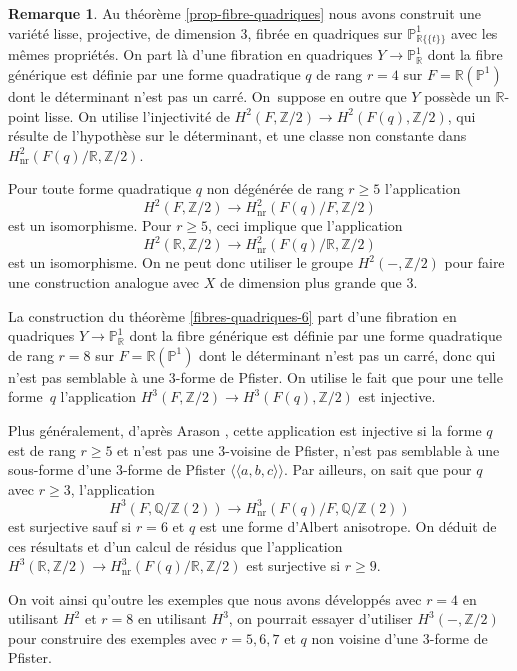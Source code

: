 \documentclass[JEP,XML,SOM,Unicode,francais,published]{cedram}
\theoremstyle{definition}
\newtheorem{rmk}[thm]{Remarque}
\newcommand{\Q}{\mathbb Q}
\newcommand{\Z}{\mathbb Z}
\newcommand{\R}{\mathbb R}
\renewcommand{\P}{\mathbb P}
\newcommand{\on}[1]{\operatorname{#1}}
\newcommand{\puiseux}{\mathbb{R}\{\!\{t\}\!\}}
\begin{document}
\begin{rmk}\label{autrescontrex} Au théorème \ref{prop-fibre-quadriques} nous avons construit une variété
lisse, projective, de dimension $3$, fibrée en quadriques sur $\P^1_{\puiseux}$ avec les mêmes propriétés.
On part là d'une fibration
en quadriques $Y \to \P^1_\R$ dont la fibre générique est définie par une forme quadratique $q$ de rang $r=4$ sur $F=\R(\P^1)$
dont le déterminant n'est pas un carré. On~suppose en outre
que $Y$ possède un $\R$-point lisse.
On utilise
l'injectivité de $H^2(F,\Z/2) \to H^2(F(q), \Z/2)$,
qui résulte de l'hypothèse sur le déterminant,
et une classe non constante dans $H^2_{\on{nr}}(F(q)/\R, \Z/2)$.

Pour toute forme quadratique $q$ non dégénérée de rang $r\geq 5$
l'application \[
H^2(F,\Z/2) \to H^2_{\on{nr}}(F(q)/F, \Z/2)
\]
est un isomorphisme.
Pour $r\geq 5$, ceci implique que l'application
\[
H^2(\R,\Z/2) \to H^2_{\on{nr}}(F(q)/\R, \Z/2)
\]
est un isomorphisme.
On ne peut donc utiliser le groupe
$H^2(-, \Z/2)$ pour faire une construction analogue
avec $X$ de dimension plus grande que 3.

La construction du théorème \ref{fibres-quadriques-6}
part d'une fibration
en quadriques $Y \to \P^1_\R$ dont la fibre générique est définie par une forme quadratique de rang $r= 8$ sur $F=\R(\P^1)$
dont le déterminant n'est pas un carré, donc qui n'est pas semblable à une 3-forme de Pfister.
On utilise le fait que pour une telle forme~$q$ l'application
$H^3(F,\Z/2) \to H^3(F(q), \Z/2)$ est injective.

Plus généralement, d'après Arason \cite[Satz 5.6]{arason1975cohomologische},
cette application est injective si la forme $q$
est de rang $r\geq 5$ et n'est pas une 3-voisine de Pfister, \ie
n'est pas semblable à une sous-forme d'une 3-forme
de Pfister $\langle \!\langle a,b,c \rangle \!\rangle$.
Par ailleurs, on sait \cite[Th.\,10.2.4]{kahn2008formes} que pour $q$ avec $r\geq 3$, l'application
\[
H^3(F, \Q/\Z(2)) \to H^3_{\on{nr}}(F(q)/F, \Q/\Z(2))
\]
est surjective sauf si $r=6$ et $q$
est une forme d'Albert anisotrope.
On déduit de ces résultats et d'un calcul de résidus
que l'application $H^3(\R, \Z/2) \to H^3_{\on{nr}}(F(q)/\R, \Z/2)$
est surjective si $r\geq 9$.

On voit ainsi qu'outre les exemples que nous avons développés avec $r=4$ en utilisant $H^2$ et $r=8$ en utilisant $H^3$, on pourrait essayer d'utiliser $H^3(-, \Z/2)$ pour construire des exemples avec $r=5,6,7$ et $q$ non voisine d'une 3-forme de Pfister.
\end{rmk}
\end{document}
